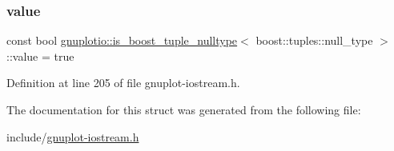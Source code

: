 \subsubsection{\texorpdfstring{value}{value}}
{\footnotesize\ttfamily const bool \hyperlink{structgnuplotio_1_1is__boost__tuple__nulltype}{gnuplotio\+::is\+\_\+boost\+\_\+tuple\+\_\+nulltype}$<$ boost\+::tuples\+::null\+\_\+type $>$\+::value = true\hspace{0.3cm}{\ttfamily [static]}}



Definition at line 205 of file gnuplot-\/iostream.\+h.



The documentation for this struct was generated from the following file\+:\begin{DoxyCompactItemize}
\item 
include/\hyperlink{gnuplot-iostream_8h}{gnuplot-\/iostream.\+h}\end{DoxyCompactItemize}
